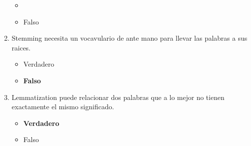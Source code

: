 \documentclass[../main.tex]{subfiles}
\begin{document}
\begin{enumerate}
\begin{itemize}
                \item {}
                \item Falso
            \end{itemize}
        \item Stemming necesita un vocavulario de ante mano para llevar las palabras a sus raices.
            \begin{itemize}
                \item Verdadero
                \item \textbf{Falso} \checkmark
            \end{itemize}
        \item Lemmatization puede relacionar dos palabras que a lo mejor no tienen exactamente el mismo significado.
            \begin{itemize}
                \item \textbf{Verdadero} \checkmark
                \item Falso
            \end{itemize}
    \end{enumerate}
\end{document}

